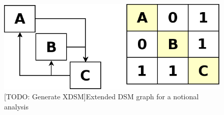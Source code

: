     \begin{figure}[!hbp]
        \begin{center}
        \includegraphics[width=.75\textwidth]{images/dsm_simple}
        \caption{[TODO: Generate XDSM]Extended DSM graph for a notional analysis \label{fig:dsm_full}}
        \end{center}
    \end{figure}
